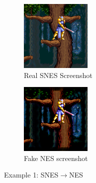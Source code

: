 \documentclass[10pt,twocolumn,letterpaper]{article}
\begin{document}
\begin{figure}[htp]
   \centering
   \begin{subfigure}[b]{0.225\textwidth}
      \includegraphics[width=\textwidth]{figures/snes_to_nes/AV_Mahjong_Club_(J)_(Unl)_copy__ucc__8_real_B.png}
      \caption{Real SNES Screenshot}
      \label{fig:ss1a}
   \end{subfigure}
   \begin{subfigure}[b]{0.225\textwidth}
      \includegraphics[width=\textwidth]{figures/snes_to_nes/AV_Mahjong_Club_(J)_(Unl)_copy__ucc__8_fake_A.png}
      \caption{Fake NES screenshot}
      \label{fig:ss1b}
   \end{subfigure}
   \caption{Example 1: SNES$\rightarrow$NES}
\end{figure}
\end{document}
